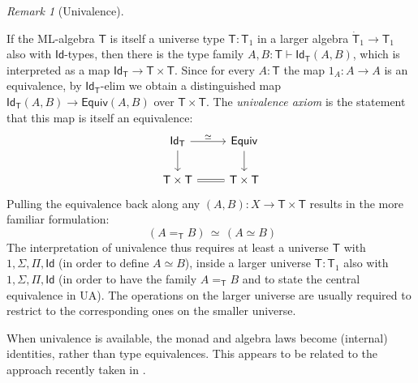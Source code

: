 \documentclass[12pt,reqno]{amsart}
\renewcommand{\to}{\ensuremath{\rightarrow}}
\newcommand{\Id}{\mathsf{Id}}
\newcommand{\T}{\ensuremath{\mathsf{T}}}
\newcommand{\TT}{\ensuremath{\dot{\mathsf{T}}}}
\theoremstyle{remark}
\newtheorem{remark}[theorem]{Remark}
\theoremstyle{definition}
\begin{document}
\begin{remark}[Univalence]\label{remark:univalence}

If the ML-algebra $\T$ is itself a universe type $\T : \T_1$ in a larger algebra $\TT_1 \to \T_1$ also with $\Id{}$-types, then there is the type family $A, B: \T \vdash \Id_{\T}(A,B)$, which is interpreted as a map $\Id_{\T}\to \T \times \T$.  Since for every $A:\T$ the map $1_A : A \to A$ is an equivalence, by $\Id_{\T}$-elim we obtain a distinguished map  $\Id_{\T}(A, B) \to \mathsf{Equiv}(A, B)$ over $\T \times \T$.  The \emph{univalence axiom} is the statement that this map is itself an equivalence:
\begin{equation}\label{diag:univalence4}
\begin{tikzcd} 
\Id_{\T} \ar[d] \ar[r, "{\simeq}"] & \mathsf{Equiv} \ar[d] \\  
 \T \times \T  \ar[r, equals] & \T \times \T
	 \end{tikzcd}
 \end{equation}
 Pulling the equivalence back along any $(A, B) : X \to \T \times \T$ results in the more familiar formulation:
 \[\tag{UA}
 \ (A =_\T B) \, \simeq\, (A \simeq B)
 \]
The interpretation of univalence thus requires at least a universe $\T$ with $1, \Sigma, \Pi, \Id{}$ (in order to define $A\simeq B$), inside a larger universe $\T:\T_1$ also with $1, \Sigma, \Pi, \Id{}$ (in order to have the family $A =_\T B$ and to state the central equivalence in UA). The operations on the larger universe are usually required to restrict to the corresponding ones on the smaller universe.  

When univalence is available, the monad and algebra laws become (internal) identities, rather than type equivalences.  This appears to be related to the approach recently taken in \cite{AberleSpivak:2024}.
\end{remark}
 
%
%
%
\end{document}
